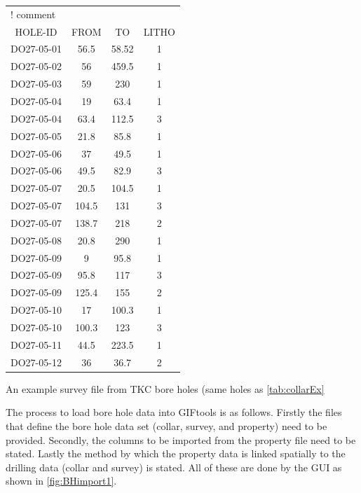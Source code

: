 \begin{fileExample}
\begin{tabular}{|cccc|}
\hline
\multicolumn{4}{|l|}{! comment} \\
HOLE-ID & FROM & TO & LITHO  \\
DO27-05-01 & 56.5 & 58.52 & 1 \\
DO27-05-02 & 56 & 459.5 & 1 \\
DO27-05-03 & 59 & 230 & 1 \\
DO27-05-04 & 19 & 63.4 & 1 \\
DO27-05-04 & 63.4 & 112.5 & 3 \\
DO27-05-05 & 21.8 & 85.8 & 1 \\
DO27-05-06 & 37 & 49.5 & 1 \\
DO27-05-06 & 49.5 & 82.9 & 3 \\
DO27-05-07 & 20.5 & 104.5 & 1 \\
DO27-05-07 & 104.5 & 131 & 3 \\
DO27-05-07 & 138.7 & 218 & 2 \\
DO27-05-08 & 20.8 & 290 & 1 \\
DO27-05-09 & 9 & 95.8 & 1 \\
DO27-05-09 & 95.8 & 117 & 3 \\
DO27-05-09 & 125.4 & 155 & 2 \\
DO27-05-10 & 17 & 100.3 & 1 \\
DO27-05-10 & 100.3 & 123 & 3 \\
DO27-05-11 & 44.5 & 223.5 & 1 \\
DO27-05-12 & 36 & 36.7 & 2 \\
\hline
\end{tabular}
\caption{An example survey file from TKC bore holes (same holes as \autoref{tab:collarEx}}
\label{tab:propEx}
\end{fileExample}

 The process to load bore hole data into GIFtools is as follows. Firstly the files that define the bore hole data set (collar, survey, and property) need to be provided. Secondly, the columns to be imported from the property file need to be stated. Lastly the method by which the property data is linked spatially to the drilling data (collar and survey) is stated. All of these are done by the GUI as shown in \autoref{fig:BHimport1}.

